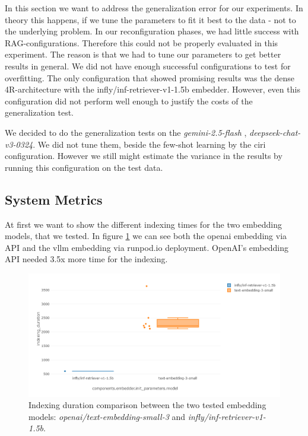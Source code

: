In this section we want to address the generalization error for our experiments. In theory this happens, if we tune the parameters to fit it best to the data - not to the underlying problem. In our reconfiguration phases, we had little success with RAG-configurations. Therefore this could not be properly evaluated in this experiment. The reason is that we had to tune our parameters to get better results in general. We did not have enough successful configurations to test for overfitting. The only configuration that showed promising results was the dense 4R-architecture with the infly/inf-retriever-v1-1.5b embedder. However, even this configuration did not perform well enough to justify the costs of the generalization test. 

We decided to do the generalization tests on the \textit{gemini-2.5-flash} \cite{gemini-2.0}, \textit{deepseek-chat-v3-0324}. We did not tune them, beside the few-shot learning by the ciri configuration. However we still might estimate the variance in the results by running this configuration on the test data.

\subsection{System Metrics}

At first we want to show the different indexing times for the two embedding models, that we tested. In figure \ref{fig:indexing-time} we can see both the openai embedding via API and the vllm embedding via runpod.io deployment. OpenAI's embedding API needed 3.5x more time for the indexing.

\begin{figure}[!ht]
    \centering
    \includegraphics[width=\textwidth]{images/indexing-time.png}
    \caption{Indexing duration comparison between the two tested embedding models: \textit{openai/text-embedding-small-3} and \textit{infly/inf-retriever-v1-1.5b}.}
    \label{fig:indexing-time}
\end{figure}

